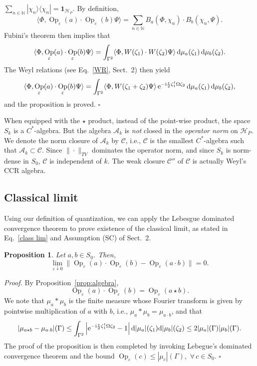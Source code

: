 \documentclass[11pt]{article}
\DeclareMathOperator{\Op}{Op}
\newcommand{\id}{\mathbf{1}}
\newcommand{\nn}{\mathbb{N}}
\renewcommand{\d}{{\rm d}}
\newcommand{\e}{{\rm e}}
\renewcommand{\i}{{\rm i}}
\newtheorem{proposition}[theorem]{Proposition}
\begin{document}
$\sum_{n\in \nn} |\chi_n\rangle\langle\chi_n|=\id_{\mathcal H_P}$. By definition,
$$\langle \Phi,\Op_{\varepsilon}(a)\cdot \Op_\varepsilon(b)\Psi\rangle=\sum_{n\in \nn} B_a(\Phi,\chi_n)\cdot B_b(\chi_n,\Psi).$$
Fubini's theorem then implies that
$$\langle \Phi,\Op_{\varepsilon}(a)\cdot \Op_\varepsilon(b)\Psi\rangle=\int_{\Gamma^2}\langle \Phi,W(\zeta_1)\cdot W(\zeta_2)\Psi\rangle\, \d\mu_a(\zeta_1)\,\d\mu_b(\zeta_2).$$
The Weyl relations (see Eq.~\eqref{WR}, Sect.~2) then yield
$$\langle \Phi,\Op_{\varepsilon}(a)\cdot \Op_\varepsilon(b)\Psi\rangle=\int_{\Gamma^2}\langle \Phi,W(\zeta_1+\zeta_2)\Psi\rangle\, \e^{-\i\frac\epsilon2\zeta_1^t\Omega\zeta_2}\,\d\mu_a(\zeta_1)\,\d\mu_b(\zeta_2),$$
and the proposition is proved. \hfill{$\square$}


\vspace{0.15cm} When equipped with the $\star$ product, instead of the point-wise product, the space $S_k$ is a $C^*$-algebra. 
But the algebra $\mathcal A_k$ is \textit{not} closed in the \textit{operator norm} on $\mathcal H_P$. We denote the 
norm closure of $\mathcal A_k$ by $\mathcal C$, i.e., $\mathcal{C}$ is the smallest $C^*$-algebra such that 
$\mathcal A_k\subset \mathcal C$. Since $\|\cdot\|_{TV}$ dominates the operator norm, and since $S_k$ is 
norm-dense in $S_0$, $\mathcal C$ is independent of $k$. The weak closure $\mathcal C''$ of 
$\mathcal C$ is actually Weyl's CCR algebra. 

\subsection{Classical limit}
Using our definition of quantization, we can apply the Lebesgue dominated convergence theorem to prove existence of
the classical limit, as stated in Eq.~\eqref{class lim} and Assumption (SC) of Sect.~2.

\begin{proposition}\label{prop:classical_limit_product}
Let $a,b\in S_0$. Then,
$$\lim_{\varepsilon\downarrow 0} \|\Op_\varepsilon(a)\cdot \Op_\varepsilon(b)-\Op_\varepsilon(a\cdot b)\|=0.$$
\end{proposition}
\noindent \textit{Proof.} By Proposition~\ref{prop:algebra},
$$\Op_\varepsilon(a)\cdot \Op_\varepsilon(b)=\Op_\varepsilon(a\star b).$$
We note that $\mu_a\ast\mu_b$ is the finite measure whose Fourier transform is given by pointwise multiplication of 
$a$ with $b$, i.e., $\mu_a*\mu_b=\mu_{a\cdot b}$, and that
$$|\mu_{a\star b}-\mu_{a\cdot b}|(\Gamma)\leq\int_{\Gamma^2} \left|\e^{-\i\frac{\epsilon}2\zeta_1^t\Omega\zeta_2}-1
\right|\d|\mu_a|(\zeta_1)\d|\mu_b|(\zeta_2)\leq 2 \vert \mu_a\vert (\Gamma) \vert \mu_{b}\vert(\Gamma).$$
The proof of the proposition is then completed by invoking Lebegue's dominated convergence theorem 
and the bound $\Op_\varepsilon(c)\leq |\mu_c|(\Gamma)$, \,$\forall\,c\in S_0$.  \hfill{$\square$}
\end{document}
